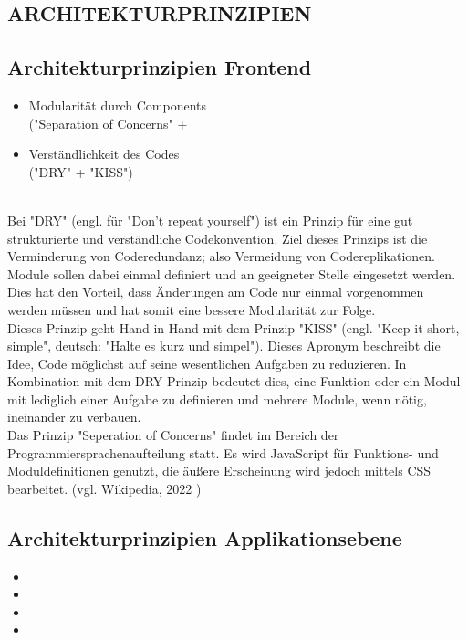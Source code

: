 \documentclass[conference]{IEEEtran}
\begin{document}
\begin{itemize}
\section{ARCHITEKTURPRINZIPIEN}
\subsection{Architekturprinzipien Frontend}
\begin{itemize}
    \item Modularität durch Components \\
    ("Separation of Concerns" +  \\
    \item Verständlichkeit des Codes \\
    ("DRY" + "KISS")
\end{itemize}
    \\Bei "DRY" (engl. für "Don't repeat yourself") ist ein Prinzip für eine gut strukturierte und verständliche Codekonvention. Ziel dieses Prinzips ist die Verminderung von Coderedundanz; also Vermeidung von Codereplikationen. Module sollen dabei einmal definiert und an geeigneter Stelle eingesetzt werden. Dies hat den Vorteil, dass Änderungen am Code nur einmal vorgenommen werden müssen und hat somit eine bessere Modularität zur Folge.
    \\Dieses Prinzip geht Hand-in-Hand mit dem Prinzip "KISS" (engl. "Keep it short, simple", deutsch: "Halte es kurz und simpel"). Dieses Apronym beschreibt die Idee, Code möglichst auf seine wesentlichen Aufgaben zu reduzieren. In Kombination mit dem DRY-Prinzip bedeutet dies, eine Funktion oder ein Modul mit lediglich einer Aufgabe zu definieren und mehrere Module, wenn nötig, ineinander zu verbauen.
    \\
    Das Prinzip "Seperation of Concerns" findet im Bereich der Programmiersprachenaufteilung statt. Es wird JavaScript für Funktions- und Moduldefinitionen genutzt, die äußere Erscheinung wird jedoch mittels CSS bearbeitet. (vgl. Wikipedia, 2022 \cite{c8})

\subsection{Architekturprinzipien Applikationsebene}
\begin{itemize}
    \item
    \item
    \item
    \item
\end{itemize}

\end{itemize}
\end{document}
